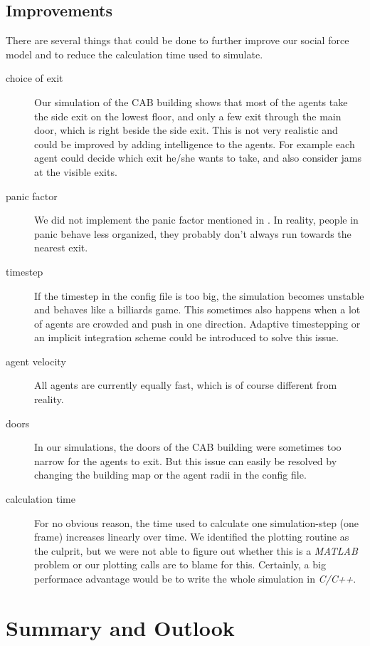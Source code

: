 \documentclass[11pt]{article}
\begin{document}
\subsection{Improvements} \label{subsection:Improvements}
There are several things that could be done to further improve our social force
model and to reduce the calculation time used to simulate.

\begin{description}
	\item[choice of exit] Our simulation of the CAB building shows that most of
		the agents take the side exit on the lowest floor, and only a few exit
		through the main door, which is right beside the side exit. This is not
		very realistic and could be improved by adding intelligence to the
		agents. For example each agent could decide which exit he/she wants to
		take, and also consider jams at the visible exits.
	\item[panic factor] We did not implement the panic factor mentioned in
		\cite{SDFEP}. In reality, people in panic behave less organized, they
		probably don't always run towards the nearest exit.
	\item[timestep] If the timestep in the config file is too big, the
		simulation becomes unstable and behaves like a billiards game. This
		sometimes also happens when a lot of agents are crowded and push in one
		direction. Adaptive timestepping or an implicit integration scheme
		could be introduced to solve this issue.
	\item[agent velocity] All agents are currently equally fast, which is of
		course different from reality.
	\item[doors] In our simulations, the doors of the CAB building were
		sometimes too narrow for the agents to exit. But this issue can easily
		be resolved by changing the building map or the agent radii in the
		config file.
	\item[calculation time] For no obvious reason, the time used to calculate
		one simulation-step (one frame) increases linearly over time. We
		identified the plotting routine as the culprit, but we were not able
		to figure out whether this is a \textit{MATLAB} problem or our plotting
		calls are to blame for this. Certainly, a big performace advantage would
		be to write the whole simulation in \textit{C/C++}. 
\end{description}

\section{Summary and Outlook}
\end{document}
